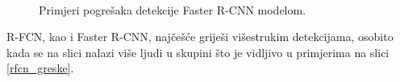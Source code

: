 \begin{figure}[H]
\begin{center}
 \
 \
\caption{Primjeri pogrešaka detekcije Faster R-CNN modelom.}
\label{faster_greske}
\end{center}
\end{figure}
R-FCN, kao i Faster R-CNN, najčešće griješi višestrukim detekcijama, osobito kada se na slici nalazi više ljudi u skupini što je vidljivo u primjerima na slici \ref{rfcn_greske}.

